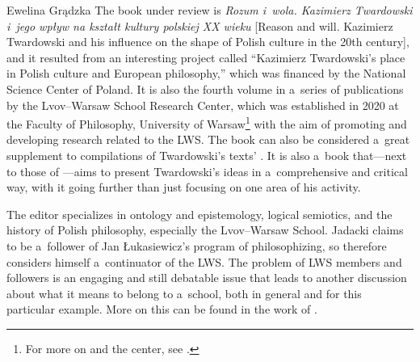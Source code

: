 \begin{newrevengenv}{Ewelina Grądzka}
The book under review is \textit{Rozum i~wola. Kazimierz Twardowski i~jego wpływ na kształt kultury polskiej XX wieku} [Reason and will. Kazimierz Twardowski and his influence on the shape of Polish culture in the 20th century], and it resulted from an interesting project called ``Kazimierz Twardowski's place in Polish culture and European philosophy,'' which was financed by the National Science Center of Poland. It is also the fourth volume in a~series of publications
\parencites[cf.][]{brozek_analiza_2020}{brozek_anti-irrationalism_2020}{jadacki_stanislaw_2020}
by the Lvov–Warsaw School Research Center, which was established in 2020 at the Faculty of Philosophy, University of Warsaw\footnote{For more on \parencite{brozek_analiza_2020} and the center, see \parencites{gradzka_putting_2021}{gradzka_report_2021}.}
with the aim of promoting and developing research related to the LWS. The book can also be considered a~great supplement to compilations of Twardowski's texts'
\parencites{twardowski_rozprawy_1927}{decewicz_wybor_1992}{twardowski_mysl_2013}{twardowski_mysl_2014}{brandl_actions_1999}{brozek_anti-irrationalism_2020}.
It is also a~book that---next to those of
\parencites{jadczak_czlowiek_1993}{kleszcz_metoda_2013}[and][]{brozek_kazimierz_2015}---aims to present Twardowski's ideas in a~comprehensive and critical way, with it going further than just focusing on one area of his activity.


The editor specializes in ontology and epistemology, logical semiotics, and the history of Polish philosophy, especially the Lvov–Warsaw School. Jadacki claims to be a~follower of Jan Łukasiewicz's program of philosophizing, so therefore considers himself a~continuator of the LWS. The problem of LWS members and followers is an engaging and still debatable issue that leads to another discussion about what it means to belong to a~school, both in general and for this particular example. More on this can be found in the work of
\parencite{wolenski_filozoficzna_1985}.


\end{newrevengenv}
